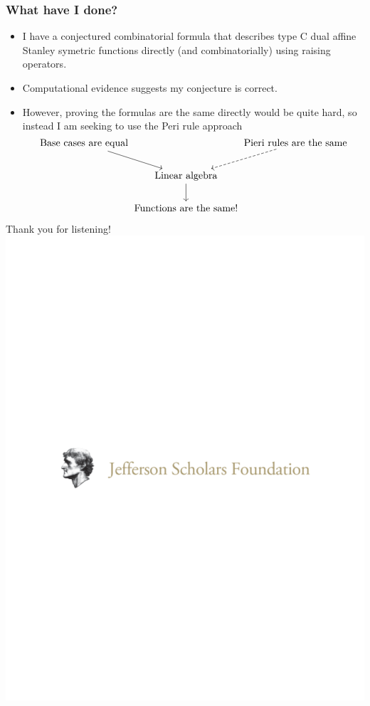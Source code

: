 \documentclass{beamer}
\begin{document}
\begin{frame}[fragile]
  \frametitle{What have I done?}
  \begin{itemize}
  \item I have a conjectured combinatorial formula that describes type
    C dual affine Stanley symetric functions directly (and
    combinatorially) using raising operators. \pause
  
   \item Computational evidence suggests my conjecture is correct. \pause
  
   \item However, proving the formulas are the same directly would be quite
    hard, so instead I am seeking to use the Peri rule approach \[
      \begin{tikzcd}[cramped, column sep=0.01em]
        \text{Base cases are equal} \ar[rd]&\, & \ar[ld, dashed] \text{Pieri rules are the same}\\
        \ &\text{Linear algebra} \ar[d] & \ \\
        \ &\text{Functions are the same!} & \
      \end{tikzcd}
    \]
  \end{itemize}
  \end{frame}
  \begin{frame}
    \begin{center}
      Thank you for listening!\\
      \includegraphics[scale=0.5]{images/jsf_horizontal_logo.pdf}
    \end{center}
  \end{frame}
\end{document}
